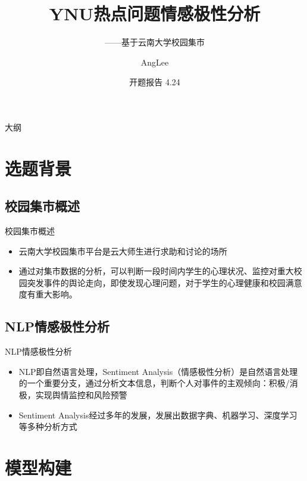 \documentclass[UTF8]{ctexbeamer}
\title{YNU热点问题情感极性分析}
\subtitle{——基于云南大学校园集市}
\author{AngLee}
\institute[Universitiy]{
	2023 Spring MachineLearning Course\\
	YunNan University
 }
\date{开题报告 4.24}
\begin{document}
\begin{frame}
  \titlepage
\end{frame}

\begin{frame}{大纲}
  \tableofcontents
\end{frame}


\section{选题背景}

\subsection{校园集市概述}
\begin{frame}{校园集市概述}
  \begin{itemize}
  \item {
    云南大学校园集市平台是云大师生进行求助和讨论的场所 }
  \item {
    通过对集市数据的分析，可以判断一段时间内学生的心理状况、监控对重大校园突发事件的舆论走向，即使发现心理问题，对于学生的心理健康和校园满意度有重大影响。
  }
  \end{itemize}
\end{frame}

\subsection{NLP情感极性分析}

\begin{frame}{NLP情感极性分析}
   \begin{itemize}
  \item {
    NLP即自然语言处理，Sentiment Analysis（情感极性分析）是自然语言处理的一个重要分支，通过分析文本信息，判断个人对事件的主观倾向：积极/消极，实现舆情监控和风险预警
  }
  \item {
    Sentiment Analysis经过多年的发展，发展出数据字典、机器学习、深度学习等多种分析方式
  }
  \end{itemize}
\end{frame}


\section{模型构建}
\end{document}
